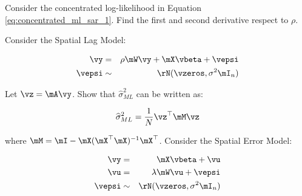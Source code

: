 \begin{exercises}
    \exercise Consider the concentrated log-likelihood in Equation \eqref{eq:concentrated_ml_sar_1}. Find the first and second derivative respect to $\rho$.
% 
% 
% 
% 
% 

	
    \exercise Consider the Spatial Lag Model:
  
      \begin{eqnarray*}
      \vy & = & \rho\mW\vy +\mX\vbeta + \vepsi \\
      \vepsi & \sim &\rN(\vzeros, \sigma^2\mI_n)
      \end{eqnarray*}
      
      Let $\vz = \mA\vy$. Show that $\widehat{\sigma}^2_{ML}$ can be written as:
      
      \begin{equation*}
      \widehat{\sigma}^2_{ML} = \frac{1}{N}\vz^\top\mM\vz
      \end{equation*}
      
      where $\mM = \mI - \mX(\mX^\top\mX)^{-1}\mX^\top$. 
    \exercise Consider the Spatial Error Model:
	
	\begin{eqnarray*}
		\vy    & = & \mX\vbeta + \vu \label{eq:sac_eq_1}\\
		\vu & = &\lambda\mW\vu + \vepsi\label{eq:sac_eq_2} \\
		\vepsi & \sim &\rN(\vzeros, \sigma^2\mI_n)
	\end{eqnarray*}
	

\end{exercises}

